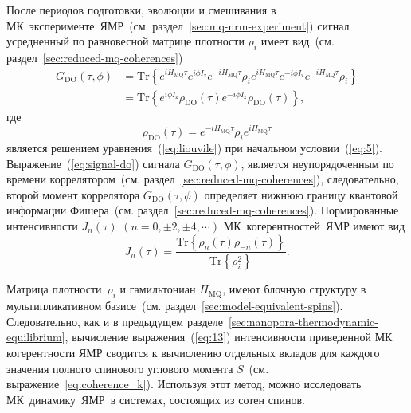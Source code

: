 После периодов подготовки, эволюции и смешивания в МК~эксперименте~ЯМР~(см. раздел~\ref{sec:mq-nrm-experiment})
сигнал усредненный по равновесной матрице плотности $\rho_i$
имеет вид~(см. раздел~\ref{sec:reduced-mq-coherences})
%
\begin{equation}\label{eq:signal-do}
  \begin{split}
    G_\mathrm{DO}(\tau,\phi)
    & = \mathrm{Tr}\left\{
      e^{i H_\mathrm{MQ} \tau} e^{i\phi I_\mathrm{z}} e^{-i H_\mathrm{MQ}\tau}
      \rho_i
      e^{i H_\mathrm{MQ} \tau} e^{-i \phi I_\mathrm{z}} e^{-i H_\mathrm{MQ} \tau}
      \rho_i
    \right\} \\
    & = \mathrm{Tr} \left\{
    e^{i \phi I_\mathrm{z}}
    \rho_\mathrm{DO}(\tau)
    e^{-i \phi I_\mathrm{z}}
    \rho_\mathrm{DO}(\tau)
    \right\},
  \end{split}
\end{equation}
%
где
%
\begin{equation}
  \label{eq:9}
  \rho_\mathrm{DO}(\tau)
  = e^{-i H_\mathrm{MQ} \tau }
  \rho_i
  e^{i H_\mathrm{MQ} \tau}
\end{equation}
%
является решением уравнения~(\ref{eq:liouvile}) при начальном условии~(\ref{eq:5}).
Выражение~(\ref{eq:signal-do}) сигнала  $G_\mathrm{DO}(\tau,\phi)$,
является неупорядоченным по времени коррелятором~(см. раздел~\ref{sec:reduced-mq-coherences}),
следовательно, второй момент коррелятора $G_\mathrm{DO}(\tau,\phi)$ определяет
нижнюю границу квантовой информации Фишера~(см. раздел~\ref{sec:reduced-mq-coherences}).
Нормированные интенсивности $J_{n}(\tau)$ $(n=0, \pm 2, \pm 4, \cdots)$ МК~когерентностей~ЯМР
имеют вид
%
\begin{equation}\label{eq:13}
  J_{n}(\tau) = \dfrac{\mathrm{Tr} \left\{
  \rho_{n}(\tau) \rho_{-n}(\tau)
  \right\}}
  {\mathrm{Tr} \left\{\rho^2_{i} \right\}}.
\end{equation}


Матрица плотности~$\rho_i$ и гамильтониан $H_\mathrm{MQ}$,
имеют блочную структуру в мультипликативном базисе~(см. раздел~\ref{sec:model-equivalent-spins}).
Следовательно, как и в предыдущем разделе~\ref{sec:nanopora-thermodynamic-equilibrium},
вычисление выражения~(\ref{eq:13}) интенсивности приведенной МК когерентности ЯМР сводится
к вычислению отдельных вкладов
для каждого значения полного спинового углового момента $S$~(см. выражение~\ref{eq:coherence_k}).
Используя этот метод, можно исследовать МК~динамику~ЯМР~в системах, состоящих из сотен спинов.


